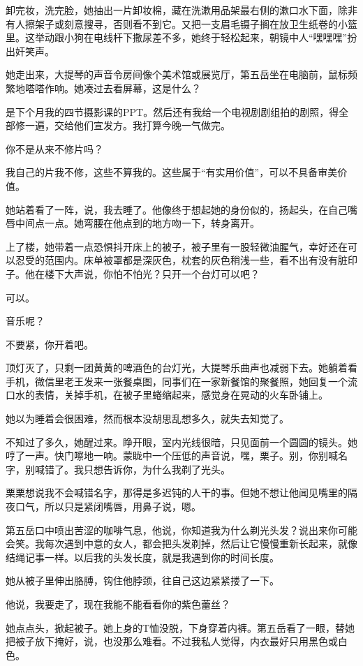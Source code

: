 \documentclass[lang=cn,newtx,12pt,scheme=chinese]{elegantbook}
\begin{document}
卸完妆，洗完脸，她抽出一片卸妆棉，藏在洗漱用品架最右侧的漱口水下面，除非有人擦架子或刻意搜寻，否则看不到它。又把一支眉毛镊子搁在放卫生纸卷的小篮里。这举动跟小狗在电线杆下撒尿差不多，她终于轻松起来，朝镜中人“嘿嘿嘿”扮出奸笑声。

她走出来，大提琴的声音令房间像个美术馆或展览厅，第五岳坐在电脑前，鼠标频繁地嗒嗒作响。她凑过去看屏幕，这是什么？

是下个月我的四节摄影课的PPT。然后还有我给一个电视剧剧组拍的剧照，得全部修一遍，交给他们宣发方。我打算今晚一气做完。

你不是从来不修片吗？

我自己的片我不修，这些不算我的。这些属于“有实用价值”，可以不具备审美价值。

她站着看了一阵，说，我去睡了。他像终于想起她的身份似的，扬起头，在自己嘴唇中间点一点。她弯腰在他点到的地方吻一下，转身离开。

上了楼，她带着一点恐惧抖开床上的被子，被子里有一股轻微油腥气，幸好还在可以忍受的范围内。床单被罩都是深灰色，枕套的灰色稍浅一些，看不出有没有脏印子。他在楼下大声说，你怕不怕光？只开一个台灯可以吧？

可以。

音乐呢？

不要紧，你开着吧。

顶灯灭了，只剩一团黄黄的啤酒色的台灯光，大提琴乐曲声也减弱下去。她躺着看手机，微信里老王发来一张餐桌图，同事们在一家新餐馆的聚餐照，她回复一个流口水的表情，关掉手机，在被子里蜷缩起来，感觉身在晃动的火车卧铺上。

她以为睡着会很困难，然而根本没胡思乱想多久，就失去知觉了。

不知过了多久，她醒过来。睁开眼，室内光线很暗，只见面前一个圆圆的镜头。她哼了一声。快门嚓地一响。蒙眬中一个压低的声音说，嘿，栗子。别，你别喊名字，别喊错了。我只想告诉你，为什么我剃了光头。

栗栗想说我不会喊错名字，那得是多迟钝的人干的事。但她不想让他闻见嘴里的隔夜口气，所以只是紧闭嘴唇，用鼻子说，嗯。

第五岳口中喷出苦涩的咖啡气息，他说，你知道我为什么剃光头发？说出来你可能会笑。我每次遇到中意的女人，都会把头发剃掉，然后让它慢慢重新长起来，就像结绳记事一样。以后我的头发长度，就是我遇到你的时间长度。

她从被子里伸出胳膊，钩住他脖颈，往自己这边紧紧搂了一下。

他说，我要走了，现在我能不能看看你的紫色蕾丝？

她点点头，掀起被子。她上身的T恤没脱，下身穿着内裤。第五岳看了一眼，替她把被子放下掩好，说，也没那么难看。不过我私人觉得，内衣最好只用黑色或白色。
\end{document}
